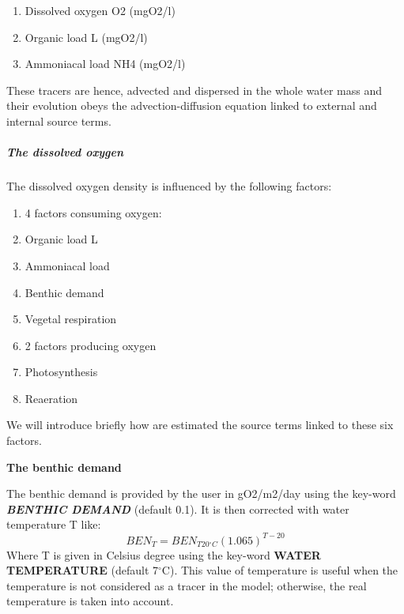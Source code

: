 \documentclass{article} %
\begin{document}
\begin{enumerate}
\item  Dissolved oxygen O2 (mgO2/l)

\item  Organic load L (mgO2/l)

\item  Ammoniacal load NH4 (mgO2/l)
\end{enumerate}

 These tracers are hence, advected and dispersed in the whole water mass and their evolution obeys the advection-diffusion equation linked to external and internal source terms.


\subparagraph{ The dissolved oxygen}

 The dissolved oxygen density is influenced by the following factors:

\begin{enumerate}
\item  4 factors consuming oxygen:

\item  Organic load L

\item  Ammoniacal load

\item  Benthic demand

\item  Vegetal respiration

\item  2 factors producing oxygen

\item  Photosynthesis

\item  Reaeration
\end{enumerate}

 We will introduce briefly how are estimated the source terms linked to these six factors.




{\bf  The benthic demand}

 The benthic demand is provided by the user in gO2/m2/day using the key-word \textbf{\textit{BENTHIC DEMAND}} (default 0.1). It is then corrected with water temperature T like:
\[{BEN}_T={BEN}_{T20{}^\circ C}{\left(1.065\right)}^{T-20}\]
Where T is given in Celsius degree using the key-word \textbf{WATER TEMPERATURE} (default 7${}^\circ$C). This value of temperature is useful when the temperature is not considered as a tracer in the model; otherwise, the real temperature is taken into account.
\end{document}
